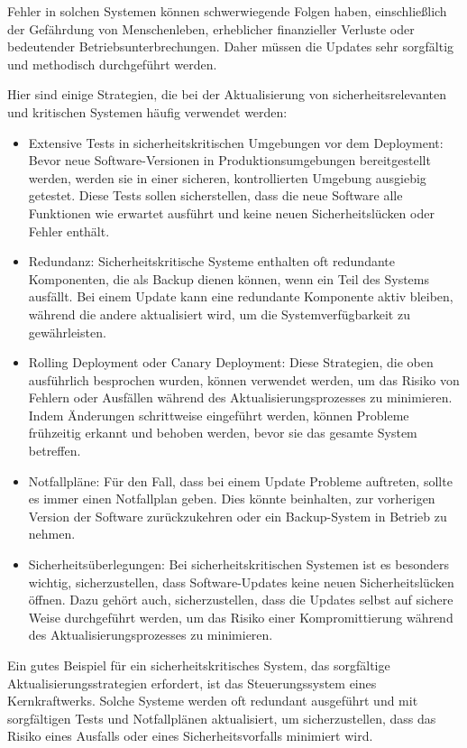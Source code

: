 Fehler in solchen Systemen können schwerwiegende Folgen haben, einschließlich der Gefährdung von Menschenleben, erheblicher finanzieller Verluste oder bedeutender Betriebsunterbrechungen. Daher müssen die Updates sehr sorgfältig und methodisch durchgeführt werden.

Hier sind einige Strategien, die bei der Aktualisierung von sicherheitsrelevanten und kritischen Systemen häufig verwendet werden:
\begin{itemize} 
\item Extensive Tests in sicherheitskritischen Umgebungen vor dem Deployment: Bevor neue Software-Versionen in Produktionsumgebungen bereitgestellt werden, werden sie in einer sicheren, kontrollierten Umgebung ausgiebig getestet. Diese Tests sollen sicherstellen, dass die neue Software alle Funktionen wie erwartet ausführt und keine neuen Sicherheitslücken oder Fehler enthält.

\item Redundanz: Sicherheitskritische Systeme enthalten oft redundante Komponenten, die als Backup dienen können, wenn ein Teil des Systems ausfällt. Bei einem Update kann eine redundante Komponente aktiv bleiben, während die andere aktualisiert wird, um die Systemverfügbarkeit zu gewährleisten.

\item Rolling Deployment oder Canary Deployment: Diese Strategien, die oben ausführlich besprochen wurden, können verwendet werden, um das Risiko von Fehlern oder Ausfällen während des Aktualisierungsprozesses zu minimieren. Indem Änderungen schrittweise eingeführt werden, können Probleme frühzeitig erkannt und behoben werden, bevor sie das gesamte System betreffen.

\item  Notfallpläne: Für den Fall, dass bei einem Update Probleme auftreten, sollte es immer einen Notfallplan geben. Dies könnte beinhalten, zur vorherigen Version der Software zurückzukehren oder ein Backup-System in Betrieb zu nehmen.

\item Sicherheitsüberlegungen: Bei sicherheitskritischen Systemen ist es besonders wichtig, sicherzustellen, dass Software-Updates keine neuen Sicherheitslücken öffnen. Dazu gehört auch, sicherzustellen, dass die Updates selbst auf sichere Weise durchgeführt werden, um das Risiko einer Kompromittierung während des Aktualisierungsprozesses zu minimieren.
\end{itemize} 
Ein gutes Beispiel für ein sicherheitskritisches System, das sorgfältige Aktualisierungsstrategien erfordert, ist das Steuerungssystem eines Kernkraftwerks. Solche Systeme werden oft redundant ausgeführt und mit sorgfältigen Tests und Notfallplänen aktualisiert, um sicherzustellen, dass das Risiko eines Ausfalls oder eines Sicherheitsvorfalls minimiert wird. 

